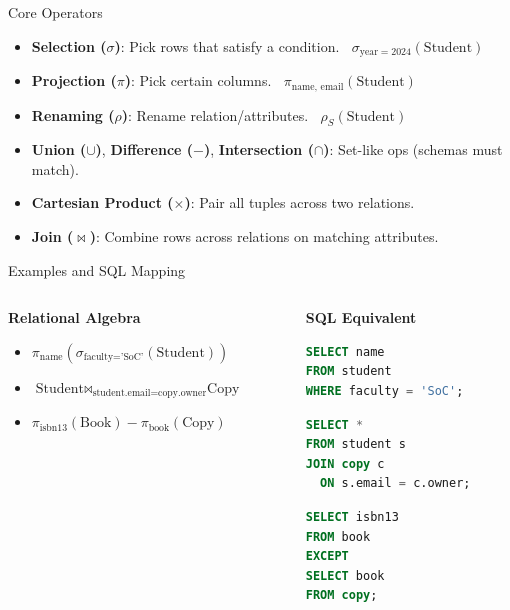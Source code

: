 \documentclass{beamer}
\begin{document}
\begin{frame}[fragile]{Core Operators}
\begin{itemize}
  \item \textbf{Selection ($\sigma$)}: Pick rows that satisfy a condition.  
  \(\;\;\sigma_{\text{year}=2024}(\text{Student})\)
  \item \textbf{Projection ($\pi$)}: Pick certain columns.  
  \(\;\;\pi_{\text{name, email}}(\text{Student})\)
  \item \textbf{Renaming ($\rho$)}: Rename relation/attributes.  
  \(\;\;\rho_{S}(\text{Student})\)
  \item \textbf{Union ($\cup$)}, \textbf{Difference ($-$)}, \textbf{Intersection ($\cap$)}: Set-like ops (schemas must match).
  \item \textbf{Cartesian Product ($\times$)}: Pair all tuples across two relations.
  \item \textbf{Join ($\bowtie$)}: Combine rows across relations on matching attributes.
\end{itemize}
\end{frame}

\begin{frame}[fragile]{Examples and SQL Mapping}
\begin{columns}[T,onlytextwidth]
\begin{column}{0.55\linewidth}
\small
\textbf{Relational Algebra}
\begin{itemize}
  \item $\pi_{\text{name}}(\sigma_{\text{faculty}=\text{'SoC'}}(\text{Student}))$
  \vspace{1.1cm}
  \item $\text{Student} \bowtie_{\text{student.email}=\text{copy.owner}} \text{Copy}$
  \vspace{1.1cm}
  \item $\pi_{\text{isbn13}}(\text{Book}) - \pi_{\text{book}}(\text{Copy})$
\end{itemize}
\end{column}
\begin{column}{0.45\linewidth}
\textbf{SQL Equivalent}
\begin{lstlisting}[language=SQL]
SELECT name
FROM student
WHERE faculty = 'SoC';
\end{lstlisting}
\begin{lstlisting}[language=SQL]
SELECT *
FROM student s
JOIN copy c
  ON s.email = c.owner;
\end{lstlisting}
\begin{lstlisting}[language=SQL]
SELECT isbn13
FROM book
EXCEPT
SELECT book
FROM copy;
\end{lstlisting}
\end{column}
\end{columns}
\end{frame}
\end{document}
